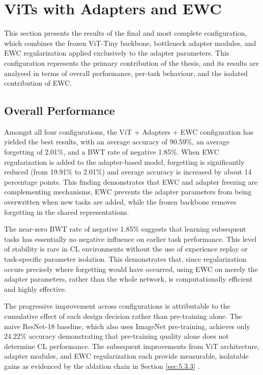 \documentclass[english, LaM, oneside]{sapthesis}%
\numberwithin{equation}{chapter}
\begin{document}
\section{ViTs with Adapters and EWC}
\label{sec:5.3}
This section presents the results of the final and most complete configuration, which combines the frozen ViT-Tiny backbone, bottleneck adapter modules, and EWC regularization applied exclusively to the adapter parameters. This configuration represents the primary contribution of the thesis, and its results are analysed in terms of overall performance, per-task behaviour, and the isolated contribution of EWC.

\subsection{Overall Performance}
Amongst all four configurations, the ViT + Adapters + EWC configuration has yielded the best results, with an average accuracy of 90.59\%, an average forgetting of 2.01\%, and a BWT rate of negative 1.85\%. When EWC regularization is added to the adapter-based model, forgetting is significantly reduced (from 19.91\% to 2.01\%) and average accuracy is increased by about 14 percentage points. This finding demonstrates that EWC and adapter freezing are complementing mechanisms, EWC prevents the adapter parameters from being overwritten when new tasks are added, while the frozen backbone removes forgetting in the shared representations.

The near-zero BWT rate of negative 1.85\% suggests that learning subsequent tasks has essentially no negative influence on earlier task performance. This level of stability is rare in CL environments without the use of experience replay or task-specific parameter isolation. This demonstrates that, since regularization occurs precisely where forgetting would have occurred, using EWC on merely the adapter parameters, rather than the whole network, is computationally efficient and highly effective.

The progressive improvement across configurations is attributable to the cumulative effect of each design decision rather than pre-training alone. The naive ResNet-18 baseline, which also uses ImageNet pre-training, achieves only 24.22\% accuracy demonstrating that pre-training quality alone does not determine CL performance. The subsequent improvements from ViT architecture, adapter modules, and EWC regularization each provide measurable, isolatable gains as evidenced by the ablation chain in Section \ref{sec:5.3.3} .
\end{document}
